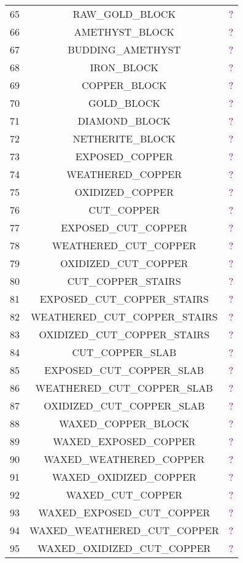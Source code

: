 \documentclass[11pt]{article}
\newcommand\myworries[1]{\textcolor{purple}{#1}}
\begin{document}
\begin{longtable}{ |c|c|c| }
	65 & RAW\_GOLD\_BLOCK & \myworries{?} \\
	66 & AMETHYST\_BLOCK & \myworries{?} \\
	67 & BUDDING\_AMETHYST & \myworries{?} \\
	68 & IRON\_BLOCK & \myworries{?} \\
	69 & COPPER\_BLOCK & \myworries{?} \\
	70 & GOLD\_BLOCK & \myworries{?} \\
	71 & DIAMOND\_BLOCK & \myworries{?} \\
	72 & NETHERITE\_BLOCK & \myworries{?} \\
	73 & EXPOSED\_COPPER & \myworries{?} \\
	74 & WEATHERED\_COPPER & \myworries{?} \\
	75 & OXIDIZED\_COPPER & \myworries{?} \\
	76 & CUT\_COPPER & \myworries{?} \\
	77 & EXPOSED\_CUT\_COPPER & \myworries{?} \\
	78 & WEATHERED\_CUT\_COPPER & \myworries{?} \\
	79 & OXIDIZED\_CUT\_COPPER & \myworries{?} \\
	80 & CUT\_COPPER\_STAIRS & \myworries{?} \\
	81 & EXPOSED\_CUT\_COPPER\_STAIRS & \myworries{?} \\
	82 & WEATHERED\_CUT\_COPPER\_STAIRS & \myworries{?} \\
	83 & OXIDIZED\_CUT\_COPPER\_STAIRS & \myworries{?} \\
	84 & CUT\_COPPER\_SLAB & \myworries{?} \\
	85 & EXPOSED\_CUT\_COPPER\_SLAB & \myworries{?} \\
	86 & WEATHERED\_CUT\_COPPER\_SLAB & \myworries{?} \\
	87 & OXIDIZED\_CUT\_COPPER\_SLAB & \myworries{?} \\
	88 & WAXED\_COPPER\_BLOCK & \myworries{?} \\
	89 & WAXED\_EXPOSED\_COPPER & \myworries{?} \\
	90 & WAXED\_WEATHERED\_COPPER & \myworries{?} \\
	91 & WAXED\_OXIDIZED\_COPPER & \myworries{?} \\
	92 & WAXED\_CUT\_COPPER & \myworries{?} \\
	93 & WAXED\_EXPOSED\_CUT\_COPPER & \myworries{?} \\
	94 & WAXED\_WEATHERED\_CUT\_COPPER & \myworries{?} \\
	95 & WAXED\_OXIDIZED\_CUT\_COPPER & \myworries{?} \\

\end{longtable}
\end{document}
